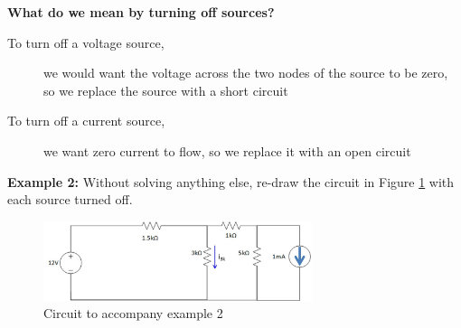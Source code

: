 \documentclass{handout}
\begin{document}

\textbf{What do we mean by turning off sources?}
\begin{description}
\item[To turn off a voltage source,] we would want the voltage across the two nodes of the source to be zero, so we replace the source with a short circuit
\item[To turn off a current source,] we want zero current to flow, so we replace it with an open circuit
\end{description}

\textbf{Example 2:} Without solving anything else, re-draw the circuit in Figure \ref{fig: Example2} with each source turned off.
\begin{figure} [h t b]
\centering
\includegraphics[width=0.7\textwidth]{Example2.jpg}
\caption{Circuit to accompany example 2}
\label{fig: Example2}
\end{figure}

\end{document}
